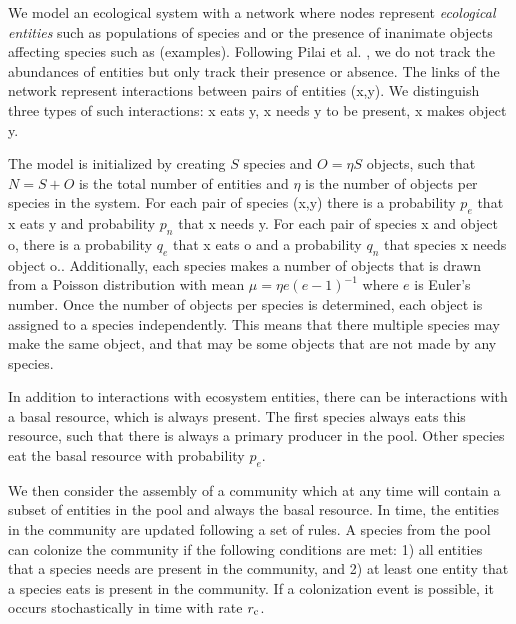 \documentclass[9pt,twocolumn,twoside]{pnas-new}
\newcommand{\rr}[1]{{\rm #1}}
\begin{document}
  \footnotesize{
  We model an ecological system with a network where nodes represent \emph{ecological entities} such as populations of species and or the presence of inanimate objects affecting species such as (examples).
  Following Pilai et al. \cite{Pillai2011}, we do not track the abundances of entities but only track their presence or absence.
  The links of the network represent interactions between pairs of entities (x,y).
  We distinguish three types of such interactions: x eats y, x needs y to be present, x makes object y.


  The model is initialized by creating $S$ species and $O = \eta S$ objects, such that $N=S+O$ is the total number of entities and $\eta$ is the number of objects per species in the system.
  For each pair of species (x,y) there is a probability $p_e$ that x eats y and probability $p_n$ that x needs y.
  For each pair of species x and object o, there is a probability $q_e$ that x eats o and a probability $q_n$ that species x needs object o..
  Additionally, each species makes a number of objects that is drawn from a Poisson distribution with mean $\mu = \eta e(e-1)^{-1}$ where $e$ is Euler's number.
  Once the number of objects per species is determined, each object is assigned to a species independently.
  This means that there multiple species may make the same object, and that may be some objects that are not made by any species.

  In addition to interactions with ecosystem entities, there can be interactions with a basal resource, which is always present.
  The first species always eats this resource, such that there is always a primary producer in the pool.
  Other species eat the basal resource with probability $p_e$.

  We then consider the assembly of a community which at any time will contain a subset of entities in the pool and always the basal resource.
  In time, the entities in the community are updated following a set of rules.
  A species from the pool can colonize the community if the following conditions are met:
  1) all entities that a species needs are present in the community, and
  2) at least one entity that a species eats is present in the community.
  If a colonization event is possible, it occurs stochastically in time with rate $r_\rr{c}$.

}
\end{document}
